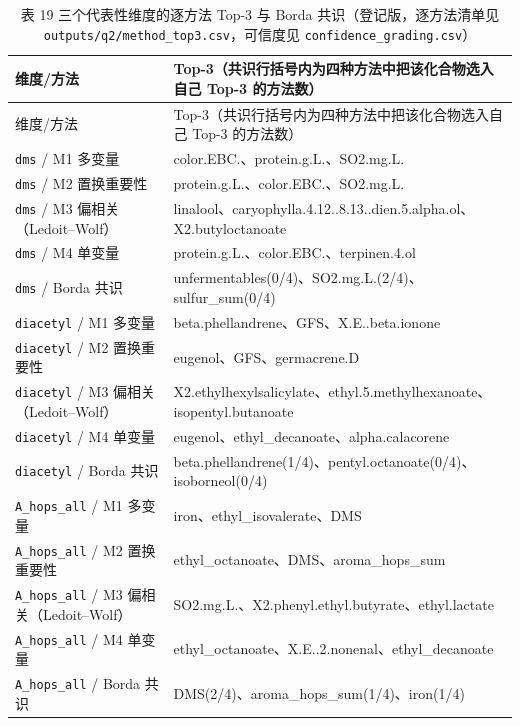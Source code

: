 \documentclass[
  a4paper,12pt]{article}
\newcounter{none} %
\begin{document}
\begin{longtable}[]{@{}
  >{\raggedright\arraybackslash}p{}
  >{\raggedright\arraybackslash}p{}@{}}
\caption{表 19 三个代表性维度的逐方法 Top-3 与 Borda
共识（登记版，逐方法清单见
\protect\texttt{outputs/q2/method\_top3.csv}，可信度见
\protect\texttt{confidence\_grading.csv}）}\tabularnewline
\toprule\noalign{}
\begin{minipage}[b]{\linewidth}\raggedright
维度/方法
\end{minipage} & \begin{minipage}[b]{\linewidth}\raggedright
Top-3（共识行括号内为四种方法中把该化合物选入自己 Top-3 的方法数）
\end{minipage} \\
\midrule\noalign{}
\endfirsthead
\toprule\noalign{}
\begin{minipage}[b]{\linewidth}\raggedright
维度/方法
\end{minipage} & \begin{minipage}[b]{\linewidth}\raggedright
Top-3（共识行括号内为四种方法中把该化合物选入自己 Top-3 的方法数）
\end{minipage} \\
\midrule\noalign{}
\endhead
\bottomrule\noalign{}
\endlastfoot
\texttt{dms} / M1 多变量 & color.EBC.、protein.g.L.、SO2.mg.L. \\
\texttt{dms} / M2 置换重要性 & protein.g.L.、color.EBC.、SO2.mg.L. \\
\texttt{dms} / M3 偏相关（Ledoit--Wolf） &
linalool、caryophylla.4.12..8.13..dien.5.alpha.ol、X2.butyloctanoate \\
\texttt{dms} / M4 单变量 & protein.g.L.、color.EBC.、terpinen.4.ol \\
\texttt{dms} / Borda 共识 &
unfermentables(0/4)、SO2.mg.L.(2/4)、sulfur\_sum(0/4) \\
\texttt{diacetyl} / M1 多变量 &
beta.phellandrene、GFS、X.E..beta.ionone \\
\texttt{diacetyl} / M2 置换重要性 & eugenol、GFS、germacrene.D \\
\texttt{diacetyl} / M3 偏相关（Ledoit--Wolf） &
X2.ethylhexylsalicylate、ethyl.5.methylhexanoate、isopentyl.butanoate \\
\texttt{diacetyl} / M4 单变量 &
eugenol、ethyl\_decanoate、alpha.calacorene \\
\texttt{diacetyl} / Borda 共识 &
beta.phellandrene(1/4)、pentyl.octanoate(0/4)、isoborneol(0/4) \\
\texttt{A\_hops\_all} / M1 多变量 & iron、ethyl\_isovalerate、DMS \\
\texttt{A\_hops\_all} / M2 置换重要性 &
ethyl\_octanoate、DMS、aroma\_hops\_sum \\
\texttt{A\_hops\_all} / M3 偏相关（Ledoit--Wolf） &
SO2.mg.L.、X2.phenyl.ethyl.butyrate、ethyl.lactate \\
\texttt{A\_hops\_all} / M4 单变量 &
ethyl\_octanoate、X.E..2.nonenal、ethyl\_decanoate \\
\texttt{A\_hops\_all} / Borda 共识 &
DMS(2/4)、aroma\_hops\_sum(1/4)、iron(1/4) \\
\end{longtable}
\end{document}
